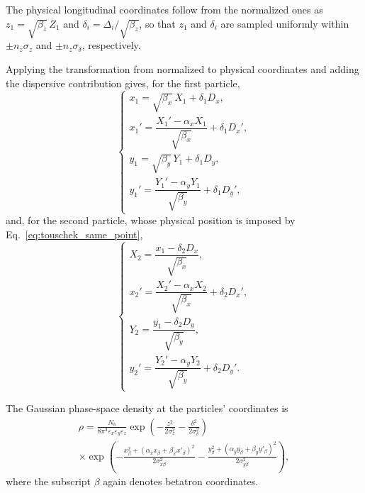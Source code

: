 The physical longitudinal coordinates follow from the normalized ones as
$z_1 = \sqrt{\beta_z}\, Z_1$ and $\delta_i = \Delta_i / \sqrt{\beta_z}$, so that
$z_1$ and $\delta_i$ are sampled uniformly within $\pm n_z \sigma_z$ and
$\pm n_z \sigma_\delta$, respectively.

Applying the transformation from normalized to physical coordinates and adding
the dispersive contribution gives, for the first particle,
\begin{equation}
    \begin{cases}
        x_1 = \sqrt{\beta_x}\, X_1 + \delta_1 D_x , \\[3pt]
        x_1' = \dfrac{X_1' - \alpha_x X_1}{\sqrt{\beta_x}} + \delta_1 D_x' , \\[6pt]
        y_1 = \sqrt{\beta_y}\, Y_1 + \delta_1 D_y , \\[3pt]
        y_1' = \dfrac{Y_1' - \alpha_y Y_1}{\sqrt{\beta_y}} + \delta_1 D_y' ,
    \end{cases}
    \label{eq:touschek_particle1}
\end{equation}
and, for the second particle, whose physical position is imposed by
Eq.~\eqref{eq:touschek_same_point},
\begin{equation}
    \begin{cases}
        X_2 = \dfrac{x_1 - \delta_2 D_x}{\sqrt{\beta_x}} , \\[6pt]
        x_2' = \dfrac{X_2' - \alpha_x X_2}{\sqrt{\beta_x}} + \delta_2 D_x' , \\[6pt]
        Y_2 = \dfrac{y_1 - \delta_2 D_y}{\sqrt{\beta_y}} , \\[6pt]
        y_2' = \dfrac{Y_2' - \alpha_y Y_2}{\sqrt{\beta_y}} + \delta_2 D_y' .
    \end{cases}
    \label{eq:touschek_particle2}
\end{equation}

The Gaussian phase-space density at the particles' coordinates is
\begin{multline}
    \rho = \frac{N_b}{8\pi^3 \varepsilon_x \varepsilon_y \varepsilon_z}
    \exp\left( -\frac{z^2}{2\sigma_z^2} - \frac{\delta^2}{2\sigma_\delta^2} \right) \\
    \times \exp\left( -\frac{x_\beta^2 + (\alpha_x x_\beta + \beta_x x'_\beta)^2}{2\sigma_{x\beta}^2}
    - \frac{y_\beta^2 + (\alpha_y y_\beta + \beta_y y'_\beta)^2}{2\sigma_{y\beta}^2} \right) ,
    \label{eq:touschek_density}
\end{multline}
where the subscript $\beta$ again denotes betatron coordinates.

